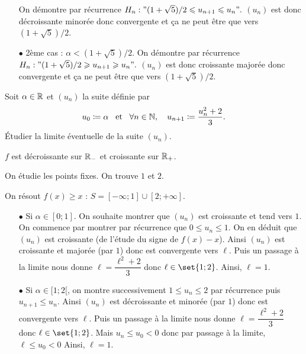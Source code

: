 \documentclass{magnoliaold}
\begin{document}
\begin{exos}
\begin{sol}
\begin{itemize}
On démontre par récurrence $H_n : "(1+\sqrt{5})/2 \leq u_{n+1}\leq u_n".$
$(u_n)$ est donc décroissante minorée donc convergente et ça ne peut être que vers $(1+\sqrt{5})/2$.
\item[$\bullet$] 2ème cas : $\alpha < (1+\sqrt{5})/2$.
On démontre par récurrence $H_n : "(1+\sqrt{5})/2 \geq u_{n+1}\geq u_n".$
$(u_n)$ est donc croissante majorée donc convergente et ça ne peut être que vers $(1+\sqrt{5})/2$.
\end{itemize}
\end{sol}  
\exo Soit $\alpha\in\R$ et $(u_n)$ la suite définie par
  \[u_0\defeq\alpha \et \forall n\in\N \qsep u_{n+1}\defeq\frac{u_n^2+2}{3}.\]
 Étudier la limite éventuelle de la suite $(u_n)$.

\begin{sol}
$f$ est décroissante sur $\RM$ et croissante sur $\RP$.

On étudie les points fixes. On trouve $1$ et $2$.

On résout $f(x)\geq x$ : $S=[-\infty;1]\cup [2;+\infty]$.

\begin{itemize}
\item[$\bullet$] Si $\alpha \in [0;1]$. On souhaite montrer que $(u_n)$ est croissante et tend vers $1$. 
On commence par montrer par récurrence que $0\leq u_n\leq 1$. On en déduit que $(u_n)$ est croissante (de l'étude du signe de $f(x)-x$). Ainsi $(u_n)$ est croissante et majorée (par $1$) donc est convergente vers $\ell$. Puis un passage à la limite nous donne $\ell=\dfrac{\ell^2+2}{3}$ donc $\ell \in \set{1;2}$. Ainsi, $\ell=1$.


\item[$\bullet$] Si $\alpha \in [1;2[$, on montre successivement $1\leq u_n\leq 2$ par récurrence puis $u_{n+1}\leq u_n$. Ainsi $(u_n)$ est décroissante et minorée (par $1$) donc est convergente vers $\ell$. Puis un passage à la limite nous donne $\ell=\dfrac{\ell^2+2}{3}$ donc $\ell \in \set{1;2}$. Mais $u_n\leq u_0<0$ donc par passage à la limite, $\ell\leq u_0<0$  Ainsi, $\ell=1$.


\end{itemize}
\end{sol}
\end{exos}
\end{document}
